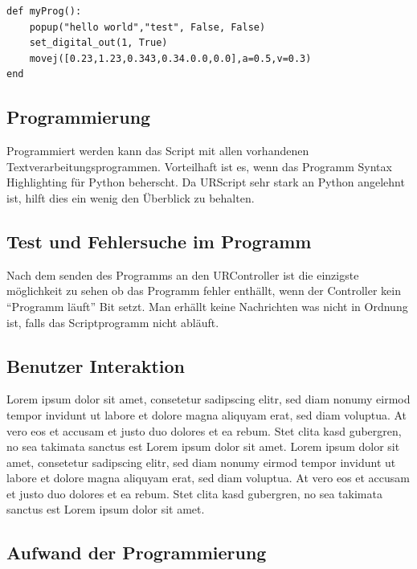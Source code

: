 \begin{lstlisting}[caption={Kleines Beispielprogram in URScript}, label=lst:urscipt_program_lst ,captionpos=b] 
def myProg():
	popup("hello world","test", False, False)
	set_digital_out(1, True)
	movej([0.23,1.23,0.343,0.34.0.0,0.0],a=0.5,v=0.3)
end
\end{lstlisting}

\subsection{Programmierung}
\label{programmierung_ur_script_rel}

Programmiert werden kann das Script mit allen vorhandenen Textverarbeitungsprogrammen. Vorteilhaft ist es, wenn das Programm \ac{Syntax Highlighting} für Python beherscht. Da URScript sehr stark an Python angelehnt ist, hilft dies ein wenig den Überblick zu behalten.

\subsection{Test und Fehlersuche im Programm}
\label{ur_script_debuggen}

Nach dem senden des Programms an den URController ist die einzigste möglichkeit zu sehen ob das Programm fehler enthällt, wenn der Controller kein ``Programm läuft'' Bit setzt. Man erhällt keine Nachrichten was nicht in Ordnung ist, falls das Scriptprogramm nicht abläuft.

\subsection{Benutzer Interaktion}
\label{ur_script_user_interaction}
Lorem ipsum dolor sit amet, consetetur sadipscing elitr, sed diam nonumy eirmod tempor invidunt ut labore et dolore magna aliquyam erat, sed diam voluptua. At vero eos et accusam et justo duo dolores et ea rebum. Stet clita kasd gubergren, no sea takimata sanctus est Lorem ipsum dolor sit amet. Lorem ipsum dolor sit amet, consetetur sadipscing elitr, sed diam nonumy eirmod tempor invidunt ut labore et dolore magna aliquyam erat, sed diam voluptua. At vero eos et accusam et justo duo dolores et ea rebum. Stet clita kasd gubergren, no sea takimata sanctus est Lorem ipsum dolor sit amet.

\subsection{Aufwand der Programmierung}
\label{ur_script_aufwand}

